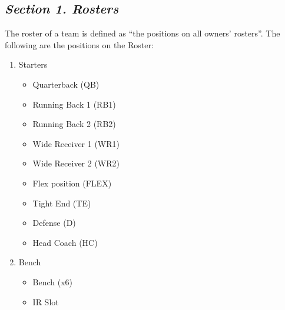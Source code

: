 \documentclass{article}
\begin{document}
    \subsection{\textit{Section 1. Rosters}}
    The roster of a team is defined as “the positions on all owners’ rosters”. The following are the positions on the Roster:
    \begin{enumerate}[label=\Alph*)]
        \item Starters
        \begin{itemize}
            \item Quarterback (QB)
            \item Running Back 1 (RB1)
            \item Running Back 2 (RB2)
            \item Wide Receiver 1 (WR1)
            \item Wide Receiver 2 (WR2)
            \item Flex position (FLEX)
            \item Tight End (TE)
            \item Defense (D)
            \item Head Coach (HC)
        \end{itemize}
        \item Bench
        \begin{itemize}
            \item Bench (x6)
            \item IR Slot
        \end{itemize}
    \end{enumerate}
\end{document}
